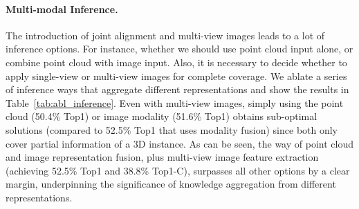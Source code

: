 \documentclass{article} \usepackage{iclr2024_conference,times}
\begin{document}
\begin{table*}[b]
\begin{subtable}[h]{0.29\textwidth}
{{}
}
\end{subtable}
\hfill
\begin{subtable}[h]{0.32\textwidth}
\caption{Multi-Modal Inference}
\label{tab:abl_inference} 
\end{subtable}
\end{table*} \paragraph{Multi-modal Inference.}
The introduction of joint alignment and multi-view images leads to a lot of inference options. 
For instance, whether we should use point cloud input alone, or combine point cloud with image input. 
Also, it is necessary to decide whether to apply single-view or multi-view images for complete coverage.
We ablate a series of inference ways that aggregate different representations and show the results in Table~\ref{tab:abl_inference}. 
Even with multi-view images, simply using the point cloud (50.4\% Top1) or image modality (51.6\% Top1) obtains sub-optimal solutions (compared to 52.5\% Top1 that uses modality fusion) since both only cover partial information of a 3D instance.
As can be seen, the way of point cloud and image representation fusion, plus multi-view image feature extraction (achieving 52.5\% Top1 and 38.8\% Top1-C), surpasses all other options by a clear margin, underpinning the significance of knowledge aggregation from different representations.
\end{document}
